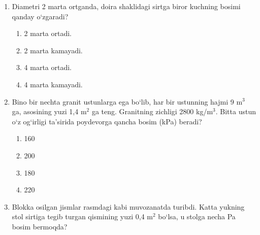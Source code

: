 \begin{enumerate}
\begin{enumerate}[label=\Alph*)]
\item 1
\item 2
\item 3
\item hamma holatlarda bosim bir xil.

\end{enumerate}

\item Diametri 2 marta ortganda, doira shaklidagi sirtga biror kuchning bosimi qanday 
o‘zgaradi? 
\begin{enumerate}[label=\Alph*)]
\item 2 marta ortadi.
\item 2 marta kamayadi. 
\item 4 marta ortadi.
\item 4 marta kamayadi.
\end{enumerate}

\item Bino bir nechta granit ustunlarga ega bo‘lib, har bir ustunning hajmi 9 m$^3$ ga, asosining yuzi 1,4 m$^2$ ga teng. Granitning zichligi 2800 kg/m$^3$. Bitta ustun o‘z og‘irligi ta’sirida poydevorga qancha bosim (kPa) beradi? 
\begin{enumerate}[label=\Alph*)]
\item 160
\item 200
\item 180
\item 220
\end{enumerate}

\item Blokka osilgan jismlar rasmdagi kabi muvozanatda turibdi. Katta yukning stol sirtiga tegib turgan qismining yuzi 0,4 m$^2$ bo‘lsa, u stolga necha Pa bosim bermoqda? 

\end{enumerate}
